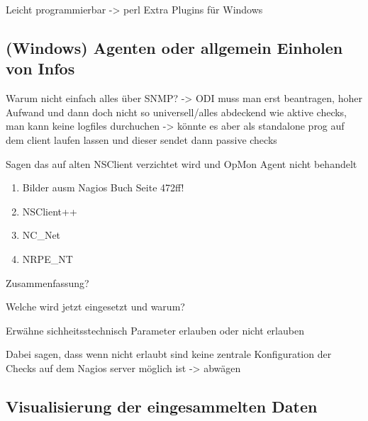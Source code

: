 Leicht programmierbar -> perl
Extra Plugins für Windows

\subsection{(Windows) Agenten oder allgemein Einholen von Infos}
Warum nicht einfach alles über SNMP? -> ODI muss man erst beantragen, hoher Aufwand und dann doch nicht so universell/alles abdeckend wie aktive checks, man kann keine logfiles durchuchen -> könnte es aber als standalone prog auf dem client laufen lassen und dieser sendet dann passive checks

Sagen das auf alten NSClient verzichtet wird und OpMon Agent nicht behandelt
\begin{enumerate}
\item Bilder ausm Nagios Buch Seite 472ff!
\item NSClient++
\item NC\_Net
\item NRPE\_NT
\end{enumerate}

Zusammenfassung?


Welche wird jetzt eingesetzt und warum?

Erwähne sichheitsstechnisch Parameter erlauben oder nicht erlauben

Dabei sagen, dass wenn nicht erlaubt sind keine zentrale Konfiguration der Checks auf dem Nagios server möglich ist -> abwägen

\subsection{Visualisierung der eingesammelten Daten}

